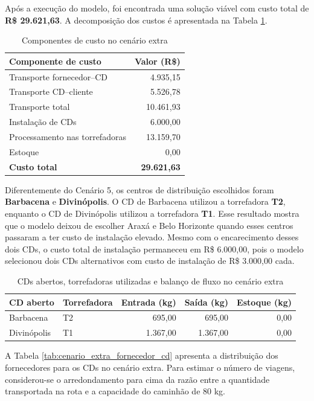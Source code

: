 \documentclass[a4paper,11pt]{article}
\begin{document}
Após a execução do modelo, foi encontrada uma solução viável com custo total de \textbf{R\$ 29.621,63}. A decomposição dos custos é apresentada na Tabela \ref{tab:cenario_extra_custos}.

\begin{table}[htbp]
\centering
\begin{tabular}{lr}
\hline
\textbf{Componente de custo} & \textbf{Valor (R\$)} \tabularnewline
\hline
Transporte fornecedor--CD & 4.935,15 \tabularnewline
Transporte CD--cliente & 5.526,78 \tabularnewline
Transporte total & 10.461,93 \tabularnewline
Instalação de CDs & 6.000,00 \tabularnewline
Processamento nas torrefadoras & 13.159,70 \tabularnewline
Estoque & 0,00 \tabularnewline
\hline
\textbf{Custo total} & \textbf{29.621,63} \tabularnewline
\hline
\end{tabular}
\caption{Componentes de custo no cenário extra}
\label{tab:cenario_extra_custos}
\end{table}

Diferentemente do Cenário 5, os centros de distribuição escolhidos foram \textbf{Barbacena} e \textbf{Divinópolis}. O CD de Barbacena utilizou a torrefadora \textbf{T2}, enquanto o CD de Divinópolis utilizou a torrefadora \textbf{T1}. Esse resultado mostra que o modelo deixou de escolher Araxá e Belo Horizonte quando esses centros passaram a ter custo de instalação elevado. Mesmo com o encarecimento desses dois CDs, o custo total de instalação permaneceu em R\$ 6.000,00, pois o modelo selecionou dois CDs alternativos com custo de instalação de R\$ 3.000,00 cada.

\begin{table}[htbp]
\centering
\begin{tabular}{llrrr}
\hline
\textbf{CD aberto} & \textbf{Torrefadora} & \textbf{Entrada (kg)} & \textbf{Saída (kg)} & \textbf{Estoque (kg)} \tabularnewline
\hline
Barbacena & T2 & 695,00 & 695,00 & 0,00 \tabularnewline
Divinópolis & T1 & 1.367,00 & 1.367,00 & 0,00 \tabularnewline
\hline
\end{tabular}
\caption{CDs abertos, torrefadoras utilizadas e balanço de fluxo no cenário extra}
\label{tab:cenario_extra_cds}
\end{table}

A Tabela \ref{tab:cenario_extra_fornecedor_cd} apresenta a distribuição dos fornecedores para os CDs no cenário extra. Para estimar o número de viagens, considerou-se o arredondamento para cima da razão entre a quantidade transportada na rota e a capacidade do caminhão de 80 kg.
\end{document}
